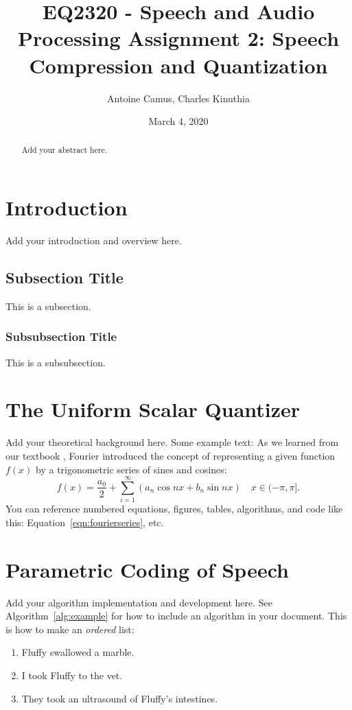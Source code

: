 \documentclass{article}
\title{ EQ2320 - Speech and Audio Processing
Assignment 2: Speech Compression and Quantization}
\author{Antoine Camus, Charles Kinuthia}
\date{March 4, 2020}
\begin{document}
\maketitle

\begin{abstract}
    Add your abstract here.
\end{abstract}

\section{Introduction}
Add your introduction and overview here.

\subsection{Subsection Title}
This is a subsection.

\subsubsection{Subsubsection Title}
This is a subsubsection.

\section{The Uniform Scalar Quantizer}
Add your theoretical background here. Some example text: As we learned from our textbook \cite{kutz_2013}, Fourier introduced the concept of representing a given function $f(x)$ by a trigonometric series of sines and cosines:
\begin{equation}
    f(x) = \frac{a_0}{2} + \sum_{i=1}^\infty \left(a_n\cos{nx} + b_n\sin{nx}\right) \quad x \in (-\pi,\pi].
    \label{eqn:fourierseries}
\end{equation}
You can reference numbered equations, figures, tables, algorithms, and code like this: Equation~\ref{eqn:fourierseries}, etc.

\section{Parametric Coding of Speech}
Add your algorithm implementation and development here. See Algorithm~\ref{alg:example} for how to include an algorithm in your document. This is how to make an \textit{ordered} list:
\begin{enumerate}
    \item Fluffy swallowed a marble.
    \item I took Fluffy to the vet.
    \item They took an ultrasound of Fluffy's intestines.
\end{enumerate}
\end{document}
